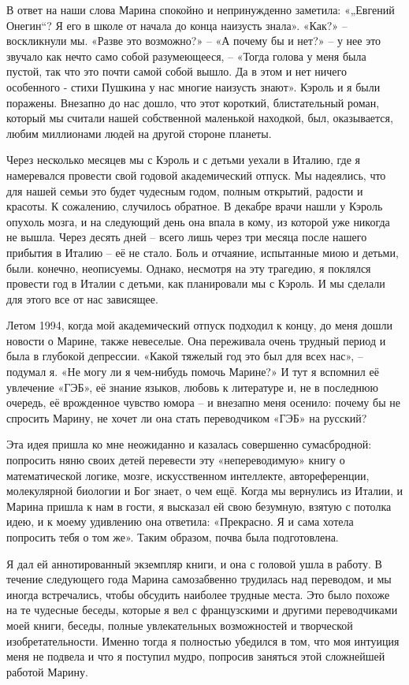 \documentclass[../main.tex]{subfiles}
\begin{document}
В ответ на наши слова Марина спокойно и непринужденно заметила: «„Евгений Онегин``?
Я его в школе от начала до конца наизусть знала».
«Как?» \--- воскликнули мы.
«Разве это возможно?» \--- «А почему бы и нет?» \--- у нее это звучало как нечто само собой разумеющееся, \--- «Тогда голова у меня была пустой, так что это почти самой собой вышло.
Да в этом и нет ничего особенного - стихи Пушкина у нас многие наизусть знают».
Кэроль и я были поражены.
Внезапно до нас дошло, что этот короткий, блистательный роман, который мы считали нашей собственной маленькой находкой, был, оказывается, любим миллионами людей на другой стороне планеты.

Через несколько месяцев мы с Кэроль и с детьми уехали в Италию, где я намеревался провести свой годовой академический отпуск.
Мы надеялись, что для нашей семьи это будет чудесным годом, полным открытий, радости и красоты.
К сожалению, случилось обратное.
В декабре врачи нашли у Кэроль опухоль мозга, и на следующий день она впала в кому, из которой уже никогда не вышла.
Через десять дней \--- всего лишь через три месяца после нашего прибытия в Италию \--- её не стало.
Боль и отчаяние, испытанные миою и детьми, были.
конечно, неописуемы.
Однако, несмотря на эту трагедию, я поклялся провести год в Италии с детьми, как планировали мы с Кэроль.
И мы сделали для этого все от нас зависящее.

Летом 1994, когда мой академический отпуск подходил к концу, до меня дошли новости о Марине, также невеселые.
Она переживала очень трудный период и была в глубокой депрессии.
«Какой тяжелый год это был для всех нас», \--- подумал я.
«Не могу ли я чем-нибудь помочь Марине?» И тут я вспомнил её увлечение «ГЭБ», её знание языков, любовь к литературе и, не в последнюю очередь, её врожденное чувство юмора \--- и внезапно меня осенило: почему бы не спросить Марину, не хочет ли она стать переводчиком «ГЭБ» на русский?

Эта идея пришла ко мне неожиданно и казалась совершенно сумасбродной: попросить няню своих детей перевести эту «непереводимую» книгу о математической логике, мозге, искусственном интеллекте, автореференции, молекулярной биологии и Бог знает, о чем ещё.
Когда мы вернулись из Италии, и Марина пришла к нам в гости, я высказал ей свою безумную, взятую с потолка идею, и к моему удивлению она ответила: «Прекрасно.
Я и сама хотела попросить тебя о том же».
Таким образом, почва была подготовлена.

Я дал ей аннотированный экземпляр книги, и она с головой ушла в работу.
В течение следующего года Марина самозабвенно трудилась над переводом, и мы иногда встречались, чтобы обсудить наиболее трудные места.
Это было похоже на те чудесные беседы, которые я вел с французскими и другими переводчиками моей книги, беседы, полные увлекательных возможностей и творческой изобретательности.
Именно тогда я полностью убедился в том, что моя интуиция меня не подвела и что я поступил мудро, попросив заняться этой сложнейшей работой Марину.
\end{document}

